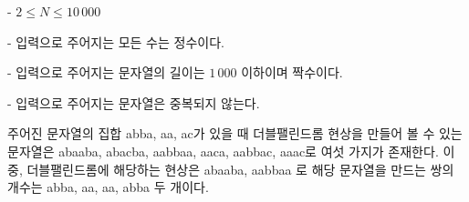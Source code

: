 - $2 \le N \le 10\,000$  

- 입력으로 주어지는 모든 수는 정수이다.

- 입력으로 주어지는 문자열의 길이는 $1\,000$ 이하이며 짝수이다. 

- 입력으로 주어지는 문자열은 중복되지 않는다. 

주어진 문자열의 집합 {abba, aa, ac}가 있을 때 더블팰린드롬 현상을 만들어 볼 수 있는 문자열은 {abaaba, abacba, aabbaa, aaca, aabbac, aaac}로 여섯 가지가 존재한다. 이 중, 더블팰린드롬에 해당하는 현상은 {abaaba, aabbaa} 로 해당 문자열을 만드는 쌍의 개수는 {abba, aa}, {aa, abba} 두 개이다.
